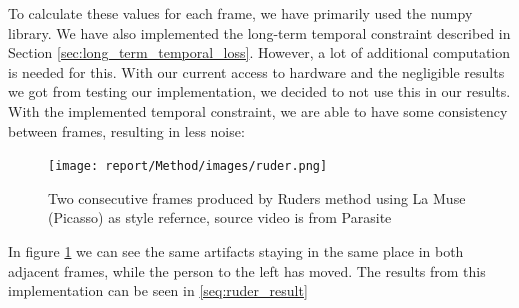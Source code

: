 \newline
To calculate these values for each frame, we have primarily used the numpy library. We have also implemented the long-term temporal constraint described in Section \ref{sec:long_term_temporal_loss}. However, a lot of additional computation is needed for this. With our current access to hardware and the negligible results we got from testing our implementation, we decided to not use this in our results.\newline\newline
With the implemented temporal constraint, we are able to have some consistency between frames, resulting in less noise: \newline
\begin{figure}[!ht]
\begin{center}
\texttt{[image: report/Method/images/ruder.png]}
\caption{Two consecutive frames produced by Ruders method using La Muse (Picasso) as style refernce, source video is from Parasite}
\label{fig:architecture}
\end{center}
\end{figure}In figure \ref{fig:architecture} we can see the same artifacts staying in the same place in both adjacent frames, while the person to the left has moved. The results from this implementation can be seen in \ref{seq:ruder_result}